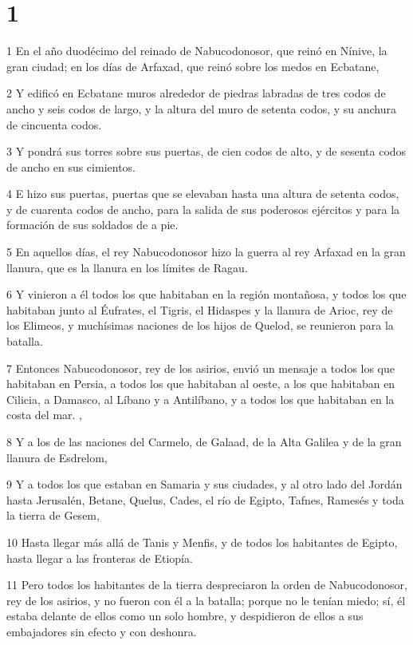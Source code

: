 



\chapter{1}

\par 1 En el año duodécimo del reinado de Nabucodonosor, que reinó en Nínive, la gran ciudad; en los días de Arfaxad, que reinó sobre los medos en Ecbatane,
\par 2 Y edificó en Ecbatane muros alrededor de piedras labradas de tres codos de ancho y seis codos de largo, y la altura del muro de setenta codos, y su anchura de cincuenta codos.
\par 3 Y pondrá sus torres sobre sus puertas, de cien codos de alto, y de sesenta codos de ancho en sus cimientos.
\par 4 E hizo sus puertas, puertas que se elevaban hasta una altura de setenta codos, y de cuarenta codos de ancho, para la salida de sus poderosos ejércitos y para la formación de sus soldados de a pie.
\par 5 En aquellos días, el rey Nabucodonosor hizo la guerra al rey Arfaxad en la gran llanura, que es la llanura en los límites de Ragau.
\par 6 Y vinieron a él todos los que habitaban en la región montañosa, y todos los que habitaban junto al Éufrates, el Tigris, el Hidaspes y la llanura de Arioc, rey de los Elimeos, y muchísimas naciones de los hijos de Quelod, se reunieron para la batalla.
\par 7 Entonces Nabucodonosor, rey de los asirios, envió un mensaje a todos los que habitaban en Persia, a todos los que habitaban al oeste, a los que habitaban en Cilicia, a Damasco, al Líbano y a Antilíbano, y a todos los que habitaban en la costa del mar. ,
\par 8 Y a los de las naciones del Carmelo, de Galaad, de la Alta Galilea y de la gran llanura de Esdrelom,
\par 9 Y a todos los que estaban en Samaria y sus ciudades, y al otro lado del Jordán hasta Jerusalén, Betane, Quelus, Cades, el río de Egipto, Tafnes, Ramesés y toda la tierra de Gesem,
\par 10 Hasta llegar más allá de Tanis y Menfis, y de todos los habitantes de Egipto, hasta llegar a las fronteras de Etiopía.
\par 11 Pero todos los habitantes de la tierra despreciaron la orden de Nabucodonosor, rey de los asirios, y no fueron con él a la batalla; porque no le tenían miedo; sí, él estaba delante de ellos como un solo hombre, y despidieron de ellos a sus embajadores sin efecto y con deshonra.
